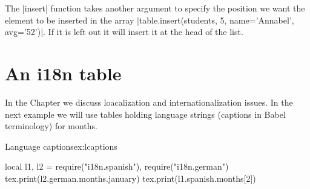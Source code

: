 The |insert| function takes another argument to specify the position we want the element to be inserted in the array |table.insert(students, 5, {name='Annabel', avg='52'})|. If it is left out it will insert it at the head of the list.

\section{An i18n table}

In the Chapter  we discuss loacalization and internationalization issues. In the next example we will use tables holding language strings (captions in Babel terminology) for months. 

\begin{texexample}{Language captions}{ex:lcaptions}
\begin{luacode}
  local l1, l2 = require("i18n.spanish"), require("i18n.german")
  tex.print(l2.german.months.january)
  tex.print(l1.spanish.months[2])
\end{luacode}
\end{texexample}













